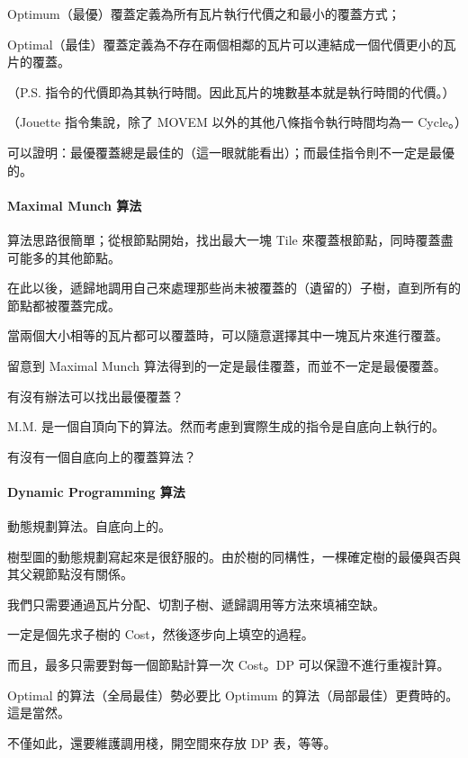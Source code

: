 \documentclass[
]{article}
\begin{document}
Optimum（最優）覆蓋定義為所有瓦片執行代價之和最小的覆蓋方式；

Optimal（最佳）覆蓋定義為不存在兩個相鄰的瓦片可以連結成一個代價更小的瓦片的覆蓋。

（P.S.
指令的代價即為其執行時間。因此瓦片的塊數基本就是執行時間的代價。）

（Jouette 指令集說，除了 MOVEM 以外的其他八條指令執行時間均為一
Cycle。）

可以證明：最優覆蓋總是最佳的（這一眼就能看出）；而最佳指令則不一定是最優的。

\hypertarget{header-n19}{%
\paragraph{Maximal Munch 算法}\label{header-n19}}

算法思路很簡單；從根節點開始，找出最大一塊 Tile
來覆蓋根節點，同時覆蓋盡可能多的其他節點。

在此以後，遞歸地調用自己來處理那些尚未被覆蓋的（遺留的）子樹，直到所有的節點都被覆蓋完成。

當兩個大小相等的瓦片都可以覆蓋時，可以隨意選擇其中一塊瓦片來進行覆蓋。

留意到 Maximal Munch 算法得到的一定是最佳覆蓋，而並不一定是最優覆蓋。

有沒有辦法可以找出最優覆蓋？

M.M. 是一個自頂向下的算法。然而考慮到實際生成的指令是自底向上執行的。

有沒有一個自底向上的覆蓋算法？

\hypertarget{header-n27}{%
\paragraph{Dynamic Programming 算法}\label{header-n27}}

動態規劃算法。自底向上的。

樹型圖的動態規劃寫起來是很舒服的。由於樹的同構性，一棵確定樹的最優與否與其父親節點沒有關係。

我們只需要通過瓦片分配、切割子樹、遞歸調用等方法來填補空缺。

一定是個先求子樹的 Cost，然後逐步向上填空的過程。

而且，最多只需要對每一個節點計算一次 Cost。DP 可以保證不進行重複計算。

Optimal 的算法（全局最佳）勢必要比 Optimum
的算法（局部最佳）更費時的。這是當然。

不僅如此，還要維護調用棧，開空間來存放 DP 表，等等。
\end{document}
